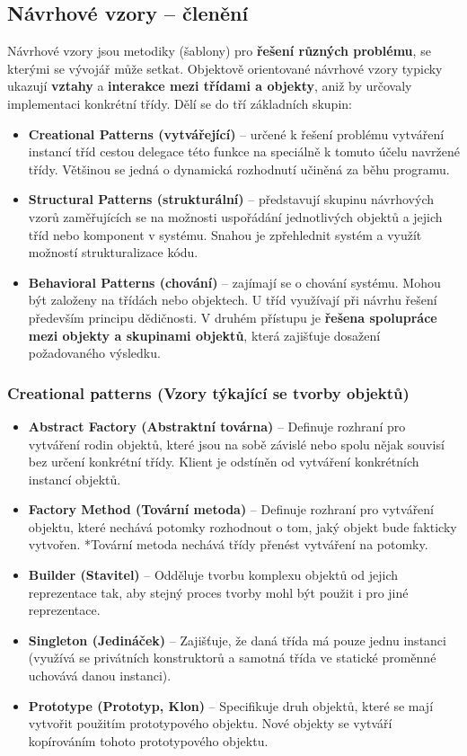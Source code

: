 \subsection{Návrhové vzory -- členění}
Návrhové vzory jsou metodiky (šablony) pro \textbf{řešení různých problému}, se kterými se vývojář může setkat. Objektově orientované návrhové vzory typicky ukazují \textbf{vztahy} a \textbf{interakce mezi třídami a objekty}, aniž by určovaly implementaci konkrétní třídy. Dělí se do tří základních skupin:
\begin{itemize}
\item \textbf{Creational Patterns (vytvářející)} -- určené k řešení problému vytváření instancí tříd cestou delegace této funkce na speciálně k tomuto účelu navržené třídy. Většinou se jedná o dynamická rozhodnutí učiněná za běhu programu.
\item \textbf{Structural Patterns (strukturální)} -- představují skupinu návrhových vzorů zaměřujících se na možnosti uspořádání jednotlivých objektů a jejich tříd nebo komponent v systému. Snahou je zpřehlednit systém a využít možností strukturalizace kódu.
\item \textbf{Behavioral Patterns (chování)} -- zajímají se o chování systému. Mohou být založeny na třídách nebo objektech. U tříd využívají při návrhu řešení především principu dědičnosti. V druhém přístupu je \textbf{řešena spolupráce mezi objekty a skupinami objektů}, která zajišťuje dosažení požadovaného výsledku.
\end{itemize}

\subsubsection{Creational patterns (Vzory týkající se tvorby objektů)}
\begin{itemize}
	\item \textbf{Abstract Factory (Abstraktní továrna)} -- Definuje rozhraní pro vytváření rodin objektů, které jsou na sobě závislé nebo spolu nějak souvisí bez určení konkrétní třídy. Klient je odstíněn od vytváření konkrétních instancí objektů.
	\item \textbf{Factory Method (Tovární metoda)} -- Definuje rozhraní pro vytváření objektu, které nechává potomky rozhodnout o tom, jaký objekt bude fakticky vytvořen. *Tovární metoda nechává třídy přenést vytváření na potomky.
	\item \textbf{Builder (Stavitel)} -- Odděluje tvorbu komplexu objektů od jejich reprezentace tak, aby stejný proces tvorby mohl být použit i pro jiné reprezentace.
	\item \textbf{Singleton (Jedináček)} -- Zajišťuje, že daná třída má pouze jednu instanci (využívá se privátních konstruktorů a samotná třída ve statické proměnné uchovává danou instanci).
	\item \textbf{Prototype (Prototyp, Klon)} -- Specifikuje druh objektů, které se mají vytvořit použitím prototypového objektu. Nové objekty se vytváří kopírováním tohoto prototypového objektu.
\end{itemize}

